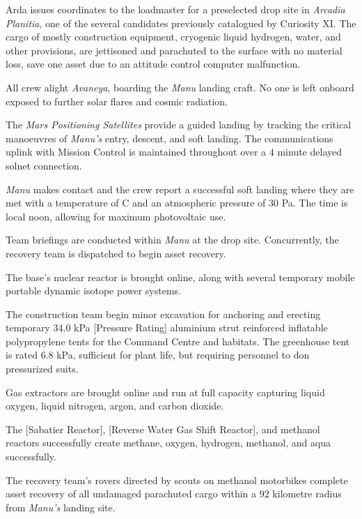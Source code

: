 Arda issues coordinates to the loadmaster for a preselected drop site in {\it Arcadia Planitia}, one of the several candidates previously catalogued by Curiosity XI. The cargo of mostly construction equipment, cryogenic liquid hydrogen, water, and other provisions, are jettisoned and parachuted to the surface with no material loss, save one asset due to an attitude control computer malfunction.
\StopTimelineDate

All crew alight {\it Avaneya}, boarding the {\it Manu} landing craft. No one is left onboard exposed to further solar flares and cosmic radiation.

The {\it Mars Positioning Satellites} provide a guided landing by tracking the critical manoeuvres of {\it Manu's} entry, descent, and soft landing. The communications uplink with Mission Control is maintained throughout over a 4 minute delayed solnet connection.

{\it Manu} makes contact and the crew report a successful soft landing where they are met with a temperature of C and an atmospheric pressure of 30 Pa. The time is local noon, allowing for maximum photovoltaic use.

Team briefings are conducted within {\it Manu} at the drop site. Concurrently, the recovery team is dispatched to begin asset recovery.

The base's nuclear reactor is brought online, along with several temporary mobile portable dynamic isotope power systems.

The construction team begin minor excavation for anchoring and erecting temporary 34.0 kPa [Pressure Rating] aluminium strut reinforced inflatable polypropylene tents for the Command Centre and habitats. The greenhouse tent is rated 6.8 kPa, sufficient for plant life, but requiring personnel to don pressurized suits.
\StopTimelineDate

Gas extractors are brought online and run at full capacity capturing liquid oxygen, liquid nitrogen, argon, and carbon dioxide. 

The [Sabatier Reactor], [Reverse Water Gas Shift Reactor], and methanol reactors successfully create methane, oxygen, hydrogen, methanol, and aqua successfully.
\StopTimelineDate

The recovery team's rovers directed by scouts on methanol motorbikes complete asset recovery of all undamaged parachuted cargo within a 92 kilometre radius from {\it Manu's} landing site.
\StopTimelineDate

